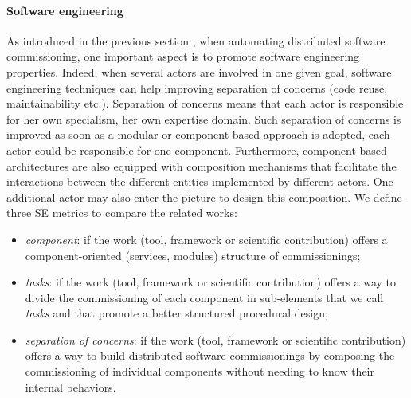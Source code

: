 \paragraph{Software engineering}
As introduced in the previous section , when automating distributed
software commissioning, one important aspect is to promote software
engineering properties. Indeed, when several actors are involved in
one given goal, software engineering techniques can help improving
separation of concerns (\ie code reuse, maintainability
etc.). Separation of concerns means that each actor is responsible for
her own specialism, \ie her own expertise domain. Such separation of
concerns is improved as soon as a modular or component-based approach
is adopted, \ie each actor could be responsible for one
component. Furthermore, component-based architectures are also equipped
with composition mechanisms that facilitate the interactions between the
different entities implemented by different actors. One additional
actor may also enter the picture to design this composition. We define
three SE metrics to compare the related works:
\begin{itemize}
\item \emph{component}: if the work (tool, framework or scientific
  contribution) offers a component-oriented (\eg services, modules)
  structure of commissionings;
\item \emph{tasks}: if the work (tool, framework or scientific
  contribution) offers a way to divide the commissioning of each
  component in sub-elements that we call \emph{tasks} and that promote
  a better structured procedural design;
\item \emph{separation of concerns}: if the work (tool, framework or
  scientific contribution) offers a way to build distributed software
  commissionings by composing the commissioning of individual
  components without needing to know their internal behaviors.
\end{itemize}


